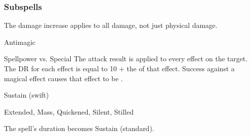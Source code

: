 \subsubsection{Subspells}
The damage increase applies to all damage, not just physical damage.
\begin{spellsection}{Antimagic}
\begin{spellcontent}
\begin{spelltargetinginfo}
\end{spelltargetinginfo}
\begin{spelleffects}
\begin{spellattack}{Spellpower vs. Special}
\spellspecial
The attack result is applied to every  effect on the target.
The DR for each effect is equal to 10 + the  of that effect.
\spellsuccess
Success against a magical effect causes that effect to be .
\end{spellattack}
\spelldur Sustain (swift)
\end{spelleffects}
\end{spellcontent}
\begin{spellfooter}
 Extended, Mass, Quickened, Silent, Stilled
\end{spellfooter}
\begin{spellsubcontent}
\begin{spellcantrip}
The spell's duration becomes Sustain (standard).
\end{spellcantrip}
\end{spellsubcontent}
\end{spellsection}

